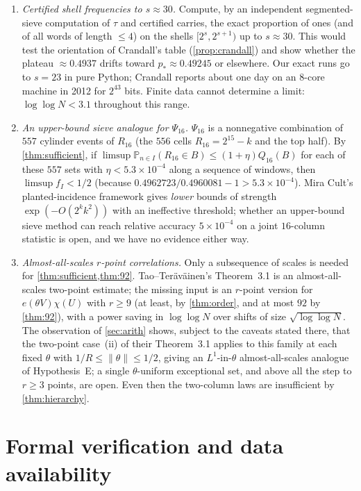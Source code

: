 \documentclass[11pt]{article}
\renewcommand{\Pr}{\mathbb P}
\begin{document}
\begin{enumerate}[label=\textbf{T\arabic*.},leftmargin=2.2em]
\item \emph{Certified shell frequencies to $s\approx30$.} Compute, by an independent segmented-sieve computation of $\tau$ and certified carries, the exact proportion of ones (and of all words of length $\le4$) on the shells $[2^s,2^{s+1})$ up to $s\approx30$. This would test the orientation of Crandall's table (\cref{prop:crandall}) and show whether the plateau $\approx0.4937$ drifts toward $p_*\approx0.49245$ or elsewhere. Our exact runs go to $s=23$ in pure Python; Crandall reports about one day on an $8$-core machine in 2012 for $2^{43}$ bits. Finite data cannot determine a limit: $\log\log N<3.1$ throughout this range.
\item \emph{An upper-bound sieve analogue for $\Psi_{16}$.} $\Psi_{16}$ is a nonnegative combination of $557$ cylinder events of $R_{16}$ (the $556$ cells $R_{16}=2^{15}-k$ and the top half). By \cref{thm:sufficient}, if $\limsup\Pr_{n\in I}(R_{16}\in B)\le(1+\eta)Q_{16}(B)$ for each of these $557$ sets with $\eta<5.3\times10^{-4}$ along a sequence of windows, then $\limsup f_I<1/2$ (because $0.4962723/0.4960081-1>5.3\times10^{-4}$). Mira Cult's planted-incidence framework gives \emph{lower} bounds of strength $\exp(-O(2^kk^2))$ with an ineffective threshold; whether an upper-bound sieve method can reach relative accuracy $5\times10^{-4}$ on a joint $16$-column statistic is open, and we have no evidence either way.
\item \emph{Almost-all-scales $r$-point correlations.} Only a subsequence of scales is needed for \cref{thm:sufficient,thm:92}. Tao--Ter\"av\"ainen's Theorem~3.1 is an almost-all-scales two-point estimate; the missing input is an $r$-point version for $e(\theta V)\chi(U)$ with $r\ge9$ (at least, by \cref{thm:order}, and at most $92$ by \cref{thm:92}), with a power saving in $\log\log N$ over shifts of size $\sqrt{\log\log N}$. The observation of \cref{sec:arith} shows, subject to the caveats stated there, that the two-point case~(ii) of their Theorem~3.1 applies to this family at each fixed $\theta$ with $1/R\le\|\theta\|\le1/2$, giving an $L^1$-in-$\theta$ almost-all-scales analogue of Hypothesis~E; a single $\theta$-uniform exceptional set, and above all the step to $r\ge3$ points, are open. Even then the two-column laws are insufficient by \cref{thm:hierarchy}.
\end{enumerate}

\section{Formal verification and data availability}\label{sec:formal}
\end{document}
